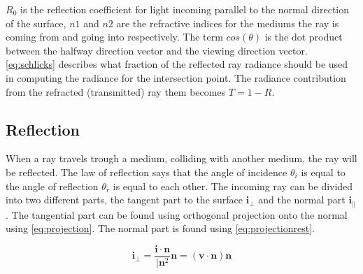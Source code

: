 \documentclass[a4paper, 12pt]{report}
\begin{document}

$R_0$ is the reflection coefficient for light incoming parallel to the normal direction of the surface, $n1$ and $n2$ are the refractive indices for the mediums the ray is coming from and going into respectively.
The term $cos(\theta)$ is the dot product between the halfway direction vector and the viewing direction vector.
\autoref{eq:schlicks} describes what fraction of the reflected ray radiance should be used in computing the radiance for the intersection point. 
The radiance contribution from the refracted (transmitted) ray them becomes $T=1-R$.

\subsection{Reflection}
When a ray travels trough a medium, colliding with another medium, the ray will be reflected.
The law of reflection says that the angle of incidence $\theta_i$ is equal to the angle of reflection $ \theta_r $ is equal to each other.
The incoming ray can be divided into two different parts, the tangent part to the surface $ \mathbf{i}_\bot $ and the normal part $ \mathbf{i}_\| $.
The tangential part can be found using orthogonal projection onto the normal using \autoref{eq:projection}. 
The normal part is found using \autoref{eq:projectionrest}.

\begin{equation} \label{eq:projection}
\mathbf{i}_\bot = \frac{\mathbf{i} \cdot \mathbf{n}} {\vert \mathbf{n}^2} \mathbf{n} = (\mathbf{v} \cdot \mathbf{n})\mathbf{n}
\end{equation}
\end{document}
